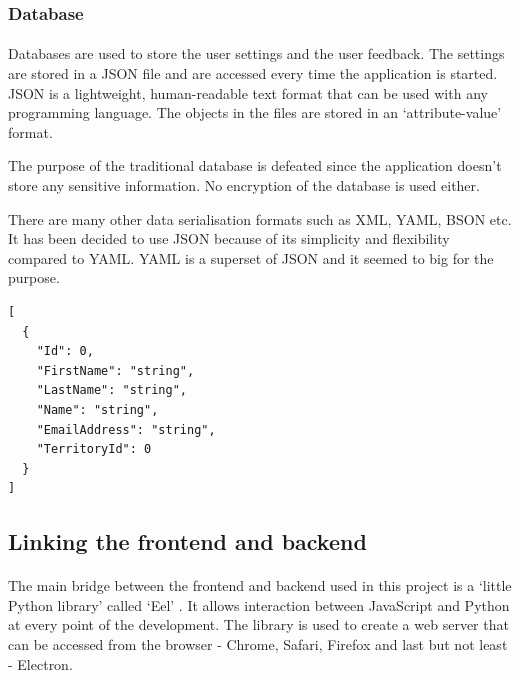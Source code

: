 \documentclass[12pt]{report}
\newenvironment{code}{\captionsetup{type=listing}}{}
\begin{document}
\subsubsection*{Database}
\paragraph{}
Databases are used to store the user settings and the user feedback. The settings are stored in a JSON file and are
accessed every time the application is started. JSON is a lightweight, human-readable text format that can be used with
any programming language. The objects in the files are stored in an `attribute-value' format. 

The purpose of the traditional database is defeated since the application doesn't store any sensitive information.
No encryption of the database is used either.

There are many other data serialisation formats such as XML, YAML, BSON etc. It has been decided to use JSON because
of its simplicity and flexibility compared to YAML. YAML is a superset of JSON and it seemed to big for the purpose.

\begin{code}
\begin{verbatim}
[
  {
    "Id": 0,
    "FirstName": "string",
    "LastName": "string",
    "Name": "string",
    "EmailAddress": "string",
    "TerritoryId": 0
  }
]
\end{verbatim}
\end{code}

\clearpage

\subsection*{Linking the frontend and backend}
\paragraph{}
The main bridge between the frontend and backend used in this project is a `little Python library' 
called `Eel' \citep{knott_2022_eel}. It allows interaction between JavaScript and Python at every point of
the development. The library is used to create a web server that can be accessed from the browser - 
Chrome, Safari, Firefox and last but not least - Electron. 
\end{document}
